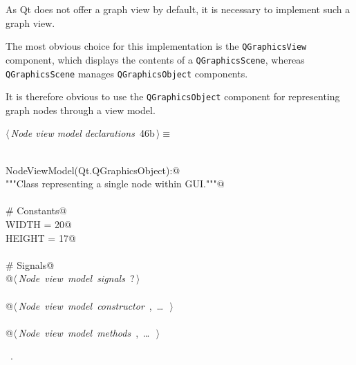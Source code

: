\documentclass[
    a4paper,      %
    10pt,         %
    openright,    %
    notitlepage,  %
    parskip=half, %
]{scrreprt}       %
\theoremstyle{definition}                    %
\begin{document}
As Qt does not offer a graph view by default, it is necessary to implement such
a graph view.

The most obvious choice for this implementation is the
\verb+QGraphicsView+ component, which displays the contents of a
\verb+QGraphicsScene+, whereas \verb+QGraphicsScene+ manages \verb+QGraphicsObject+
components.

It is therefore obvious to use the \verb+QGraphicsObject+ component
for representing graph nodes through a view model.

\begin{flushleft} \small
\begin{minipage}{\linewidth}\label{scrap59}\raggedright\small
{} $\langle\,${\itshape Node view model declarations}\nobreak\ {\footnotesize {46b}}$\,\rangle\equiv$
\vspace{-1exm}
\begin{list}{}{} \item
\mbox{}\lstinline@@\\
\mbox{}\lstinline@class NodeViewModel(Qt.QGraphicsObject):@\\
\mbox{}\lstinline@    """Class representing a single node within GUI."""@\\
\mbox{}\lstinline@@\\
\mbox{}\lstinline@    # Constants@\\
\mbox{}\lstinline@    WIDTH = 20@\\
\mbox{}\lstinline@    HEIGHT = 17@\\
\mbox{}\lstinline@@\\
\mbox{}\lstinline@    # Signals@\\
\mbox{}\lstinline@    @\hbox{$\langle\,${\itshape Node view model signals}\nobreak\ {\footnotesize ?}$\,\rangle$}\lstinline@@\\
\mbox{}\lstinline@@\\
\mbox{}\lstinline@    @\hbox{$\langle\,${\itshape Node view model constructor}\nobreak\ {\footnotesize {}, \ldots\ }$\,\rangle$}\lstinline@@\\
\mbox{}\lstinline@@\\
\mbox{}\lstinline@    @\hbox{$\langle\,${\itshape Node view model methods}\nobreak\ {\footnotesize {}, \ldots\ }$\,\rangle$}\lstinline@@\\
\mbox{}\lstinline@@{\NWsep}
\end{list}
\vspace{-1.5ex}
\footnotesize
\begin{list}{}{\setlength{\itemsep}{-\parsep}\setlength{\itemindent}{-\leftmargin}}
\item \NWtxtMacroRefIn\ .

\item{}
\end{list}
\end{minipage}\vspace{4ex}
\end{flushleft}
\end{document}
